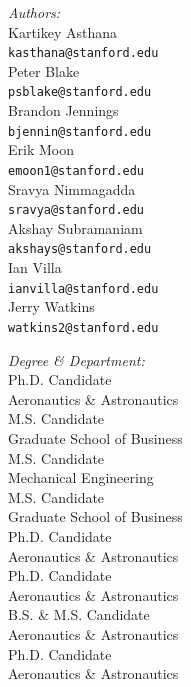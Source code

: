 \documentclass[11pt]{article}
\begin{document}
\begin{titlepage}
\begin{center}
\begin{minipage}{0.4\textwidth}
	\begin{flushleft} \large
	\emph{Authors:}\\[0.5cm]
	Kartikey Asthana\\
	\texttt{kasthana@stanford.edu}\\[0.5cm]
	Peter Blake\\
	\texttt{psblake@stanford.edu}\\[0.5cm]
	Brandon Jennings\\
	\texttt{bjennin@stanford.edu}\\[0.5cm]
	Erik Moon\\
	\texttt{emoon1@stanford.edu}\\[0.5cm]
	Sravya Nimmagadda\\
	\texttt{sravya@stanford.edu}\\[0.5cm]
	Akshay Subramaniam\\
	\texttt{akshays@stanford.edu}\\[0.5cm]
	Ian Villa\\
	\texttt{ianvilla@stanford.edu}\\[0.5cm]
	Jerry Watkins\\
	\texttt{watkins2@stanford.edu}\\[0.5cm]
\end{flushleft}
\end{minipage}
\begin{minipage}{0.4\textwidth}
	\begin{flushright} \large
	\emph{Degree \& Department:} \\[0.5cm]
	Ph.D. Candidate\\
	Aeronautics \& Astronautics\\[0.5cm]
	M.S. Candidate\\
	Graduate School of Business\\[0.5cm]
	M.S. Candidate\\
	Mechanical Engineering\\[0.5cm]
	M.S. Candidate\\
	Graduate School of Business\\[0.5cm]
	Ph.D. Candidate\\
	Aeronautics \& Astronautics\\[0.5cm]
	Ph.D. Candidate\\
	Aeronautics \& Astronautics\\[0.5cm]
	B.S. \& M.S. Candidate\\
	Aeronautics \& Astronautics\\[0.5cm]
	Ph.D. Candidate\\
	Aeronautics \& Astronautics\\[0.5cm]
\end{flushright}
\end{minipage}
\end{center}
\end{titlepage}
\end{document}
